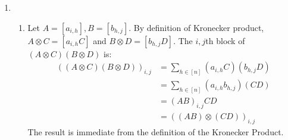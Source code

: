 \documentclass[11pt,a4paper]{article}
\begin{document}
\begin{enumerate}
    \item \begin{enumerate}
              \item Let $A = [a_{i, h}], B = [b_{h, j}]$. By definition of Kronecker product, $A \otimes C = [a_{i, h}C]$ and
                    $B \otimes D = [b_{h, j}D]$. The $i, j$th block of $(A \otimes C)(B \otimes D)$ is:
                    \begin{align*}
                        ((A \otimes C)(B \otimes D))_{i, j} & = \sum_{h \in [n]}(a_{i, h}C)(b_{h, j}D) \\
                                                            & = \sum_{h \in [n]}(a_{i, h}b_{h, j})(CD) \\
                                                            & = (AB)_{i, j} CD                         \\
                                                            & = ((AB) \otimes (CD))_{i, j}
                    \end{align*}
                    The result is immediate from the definition of the Kronecker Product.


\end{enumerate}
\end{enumerate}
\end{document}
